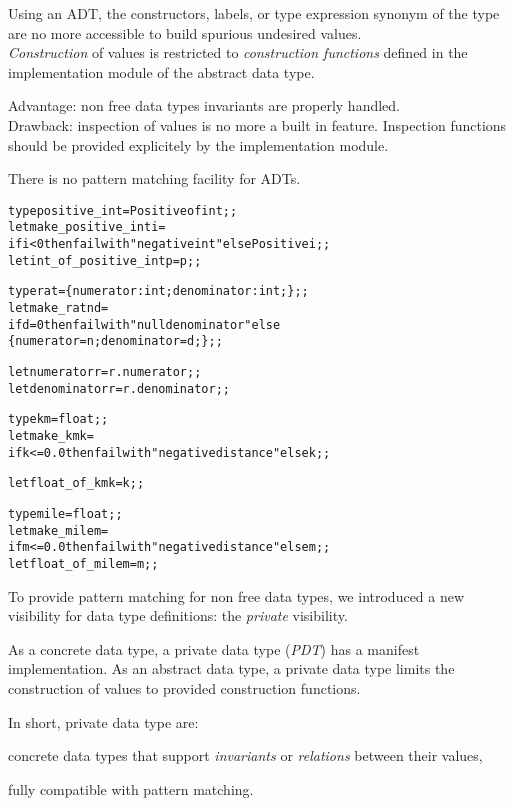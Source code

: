
Using an ADT, the constructors, labels, or type expression synonym of the type are
no more accessible to build spurious undesired values.\\
{\em Construction} of values is restricted to {\em construction
functions} defined in the implementation module of the abstract data type.

Advantage: non free data types invariants are properly handled.\\
Drawback: inspection of values is no more a built in feature. Inspection
functions should be provided explicitely by the implementation module.

There is no pattern matching facility for ADTs.


\begin{alltt}
type positive_int = Positive of int;;
let make_positive_int i =
  if i < 0 then failwith "negative int" else Positive i;;
let int_of_positive_int p = p;;

type rat = \{ numerator : int; denominator : int; \};;
let make_rat n d =
  if d = 0 then failwith "null denominator" else
  \{ numerator = n; denominator = d; \};;

let numerator r = r.numerator;;
let denominator r = r.denominator;;
\end{alltt}


\begin{alltt}
type km = float;;
let make_km k =
  if k <= 0.0 then failwith "negative distance" else k;;

let float_of_km k = k;;

type mile = float;;
let make_mile m =
  if m <= 0.0 then failwith "negative distance" else m;;
let float_of_mile m = m;;
\end{alltt}


To provide pattern matching for non free data types, we introduced a new
visibility for data type definitions: the {\em private} visibility.

As a concrete data type, a private data type ({\em PDT}) has a manifest implementation.
As an abstract data type, a private data type limits the construction of
values to provided construction functions.

In short, private data type are:
\begin{citemize}
\item concrete data types that support {\em invariants} or {\em relations}
between their values,
\item fully compatible with pattern matching.
\end{citemize}

